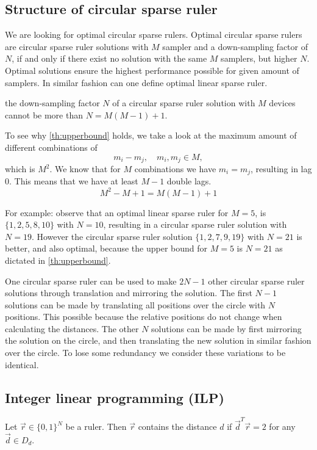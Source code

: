 \documentclass[a4paper, openany, oneside]{memoir}
\begin{document}
\subsection{Structure of circular sparse ruler}
We are looking for optimal circular sparse rulers. Optimal circular sparse rulers are circular sparse ruler solutions with $M$ sampler and a down-sampling factor of $N$, if and only if there exist no solution with the same $M$ samplers, but higher $N$. Optimal solutions ensure the highest performance possible for given amount of samplers. In similar fashion can one define optimal linear sparse ruler. 

\begin{blockTheorem}\label{th:upperbound}
the down-sampling factor $N$ of a circular sparse ruler solution with $M$ devices cannot be more than $N=M(M-1)+1$. 
\end{blockTheorem}

To see why \cref{th:upperbound} holds, we take a look at the maximum amount of different combinations of $$m_i-m_j, \quad m_i, m_j \in M,$$ which is $M^2$. We know that for $M$ combinations we have $m_i=m_j$, resulting in lag 0. This means that we have at least $M-1$ double lags. $$M^2-M+1 = M(M-1)+1$$

For example: observe that an optimal linear sparse ruler for $M=5$, is $\{1,2,5,8,10\}$ with $N=10$, resulting in a circular sparse ruler solution with $N=19$. However the circular sparse ruler solution $\{1,2,7,9,19\}$ with $N=21$ is better, and also optimal, because the upper bound for $M=5$ is $N=21$ as dictated in \cref{th:upperbound}.  

One circular sparse ruler can be used to make $2N-1$ other circular sparse ruler solutions through translation and mirroring the solution. The first $N-1$ solutions can be made by translating all positions over the circle with $N$ positions. This possible because the relative positions do not change when calculating the distances. The other $N$ solutions can be made by first mirroring the solution on the circle, and then translating the new solution in similar fashion over the circle. To lose some redundancy we consider these variations to be identical.    

\subsection{Integer linear programming (ILP)}
\begin{blockTheorem} \label{th:ruler-distance}\nolinebreak
    Let $\vec{r} \in \{0,1\}^N$ be a ruler. Then $\vec{r}$ contains the distance $d$ if $\vec{d}^T \vec{r} = 2$ for any $\vec{d} \in D_d$.\nolinebreak
\end{blockTheorem}
\end{document}
